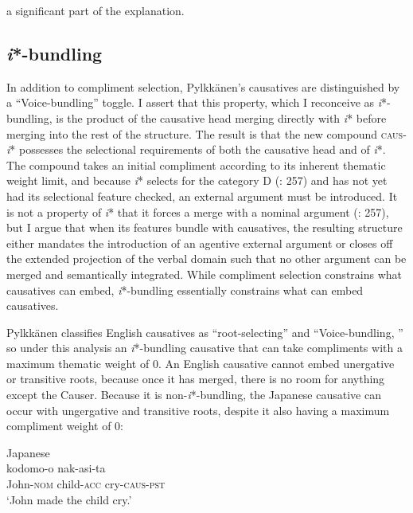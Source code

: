 \documentclass[output=paper,modfonts,nonflat]{langsci/langscibook}
\begin{document}
a significant part of the explanation.\\

\subsection{\textit{i}*-bundling}\label{sec:wechsler:2.4}

In addition to compliment selection, Pylkkänen’s causatives are distinguished by a “Voice-bundling” toggle. I assert that this property, which I reconceive as \textit{i}*-bundling, is the product of the causative head merging directly with \textit{i}* before merging into the rest of the structure. The result is that the new compound \textsc{caus}{}-\textit{i}* possesses the selectional requirements of both the causative head and of \textit{i}*. The compound takes an initial compliment according to its inherent thematic weight limit, and because \textit{i}* selects for the category D (\citealt{WoodMarantz2017}: 257) and has not yet had its selectional feature checked, an external argument must be introduced. It is not a property of \textit{i}* that it forces a merge with a nominal argument (\citealt{WoodMarantz2017}: 257), but I argue that when its features bundle with causatives, the resulting structure either mandates the introduction of an agentive external argument or closes off the extended projection of the verbal domain such that no other argument can be merged and semantically integrated. While compliment selection constrains what causatives can embed, \textit{i}*-bundling essentially constrains what can embed causatives. 



Pylkkänen classifies English causatives as “root-selecting” and “Voice-bundling, ” so under this analysis an \textit{i}*-bundling causative that can take compliments with a maximum thematic weight of 0. An English causative cannot embed unergative or transitive roots, because once it has merged, there is no room for anything except the Causer. Because it is non-\textit{i}*-bundling, the Japanese causative can occur with ungergative and transitive roots, despite it also having a maximum compliment weight of 0: 


\ea\label{ex:wechsler:11}
Japanese \citep[120]{Pylkkänen2008}\\
 {kodomo-o} {nak-asi-ta}\\
John-\textsc{nom}  child-\textsc{acc}  cry-\textsc{caus-pst}\\
\glt ‘John made the child cry.'
\z
\end{document}
